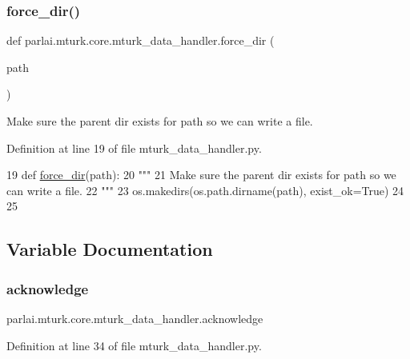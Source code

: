 \subsubsection{\texorpdfstring{force\+\_\+dir()}{force\_dir()}}
{\footnotesize\ttfamily def parlai.\+mturk.\+core.\+mturk\+\_\+data\+\_\+handler.\+force\+\_\+dir (\begin{DoxyParamCaption}\item[{}]{path }\end{DoxyParamCaption})}

\begin{DoxyVerb}Make sure the parent dir exists for path so we can write a file.
\end{DoxyVerb}
 

Definition at line 19 of file mturk\+\_\+data\+\_\+handler.\+py.


\begin{DoxyCode}
19 \textcolor{keyword}{def }\hyperlink{namespaceparlai_1_1mturk_1_1core_1_1mturk__data__handler_a28ec50366a486cded72d95c9be461c2f}{force\_dir}(path):
20     \textcolor{stringliteral}{"""}
21 \textcolor{stringliteral}{    Make sure the parent dir exists for path so we can write a file.}
22 \textcolor{stringliteral}{    """}
23     os.makedirs(os.path.dirname(path), exist\_ok=\textcolor{keyword}{True})
24 
25 
\end{DoxyCode}


\subsection{Variable Documentation}
\mbox{\label{namespaceparlai_1_1mturk_1_1core_1_1mturk__data__handler_a2a3b9b1990945eb35021d48ba28f0dcb}} 
\subsubsection{\texorpdfstring{acknowledge}{acknowledge}}
{\footnotesize\ttfamily parlai.\+mturk.\+core.\+mturk\+\_\+data\+\_\+handler.\+acknowledge}



Definition at line 34 of file mturk\+\_\+data\+\_\+handler.\+py.

